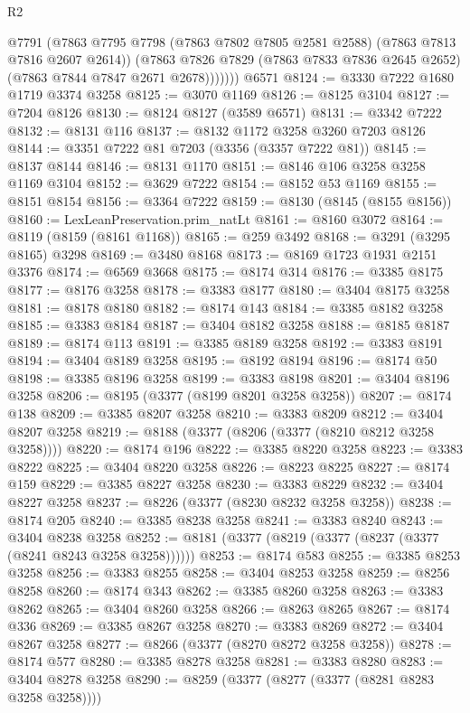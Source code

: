 \begin{lexlean}{R2}
\begin{coremodule}
              @7791
              (@7863 @7795 @7798 (@7863 @7802 @7805 @2581 @2588) (@7863 @7813 @7816 @2607 @2614))
              (@7863
                @7826
                @7829
                (@7863 @7833 @7836 @2645 @2652)
                (@7863 @7844 @7847 @2671 @2678)))))))
    @6571
@8124 := @3330 @7222 @1680 @1719 @3374 @3258
@8125 := @3070 @1169
@8126 := @8125 @3104
@8127 := @7204 @8126
@8130 := @8124 @8127 (@3589 @6571)
@8131 := @3342 @7222
@8132 := @8131 @116
@8137 := @8132 @1172 @3258 @3260 @7203 @8126
@8144 := @3351 @7222 @81 @7203 (@3356 (@3357 @7222 @81))
@8145 := @8137 @8144
@8146 := @8131 @1170
@8151 := @8146 @106 @3258 @3258 @1169 @3104
@8152 := @3629 @7222
@8154 := @8152 @53 @1169
@8155 := @8151 @8154
@8156 := @3364 @7222
@8159 := @8130 (@8145 (@8155 @8156))
@8160 := LexLeanPreservation.prim_natLt
@8161 := @8160 @3072
@8164 := @8119 (@8159 (@8161 @1168))
@8165 := @259 @3492
@8168 := @3291 (@3295 @8165) @3298
@8169 := @3480 @8168
@8173 := @8169 @1723 @1931 @2151 @3376
@8174 := @6569 @3668
@8175 := @8174 @314
@8176 := @3385 @8175
@8177 := @8176 @3258
@8178 := @3383 @8177
@8180 := @3404 @8175 @3258
@8181 := @8178 @8180
@8182 := @8174 @143
@8184 := @3385 @8182 @3258
@8185 := @3383 @8184
@8187 := @3404 @8182 @3258
@8188 := @8185 @8187
@8189 := @8174 @113
@8191 := @3385 @8189 @3258
@8192 := @3383 @8191
@8194 := @3404 @8189 @3258
@8195 := @8192 @8194
@8196 := @8174 @50
@8198 := @3385 @8196 @3258
@8199 := @3383 @8198
@8201 := @3404 @8196 @3258
@8206 := @8195 (@3377 (@8199 @8201 @3258 @3258))
@8207 := @8174 @138
@8209 := @3385 @8207 @3258
@8210 := @3383 @8209
@8212 := @3404 @8207 @3258
@8219 := @8188 (@3377 (@8206 (@3377 (@8210 @8212 @3258 @3258))))
@8220 := @8174 @196
@8222 := @3385 @8220 @3258
@8223 := @3383 @8222
@8225 := @3404 @8220 @3258
@8226 := @8223 @8225
@8227 := @8174 @159
@8229 := @3385 @8227 @3258
@8230 := @3383 @8229
@8232 := @3404 @8227 @3258
@8237 := @8226 (@3377 (@8230 @8232 @3258 @3258))
@8238 := @8174 @205
@8240 := @3385 @8238 @3258
@8241 := @3383 @8240
@8243 := @3404 @8238 @3258
@8252 := @8181 (@3377 (@8219 (@3377 (@8237 (@3377 (@8241 @8243 @3258 @3258))))))
@8253 := @8174 @583
@8255 := @3385 @8253 @3258
@8256 := @3383 @8255
@8258 := @3404 @8253 @3258
@8259 := @8256 @8258
@8260 := @8174 @343
@8262 := @3385 @8260 @3258
@8263 := @3383 @8262
@8265 := @3404 @8260 @3258
@8266 := @8263 @8265
@8267 := @8174 @336
@8269 := @3385 @8267 @3258
@8270 := @3383 @8269
@8272 := @3404 @8267 @3258
@8277 := @8266 (@3377 (@8270 @8272 @3258 @3258))
@8278 := @8174 @577
@8280 := @3385 @8278 @3258
@8281 := @3383 @8280
@8283 := @3404 @8278 @3258
@8290 := @8259 (@3377 (@8277 (@3377 (@8281 @8283 @3258 @3258))))

\end{coremodule}
\end{lexlean}
